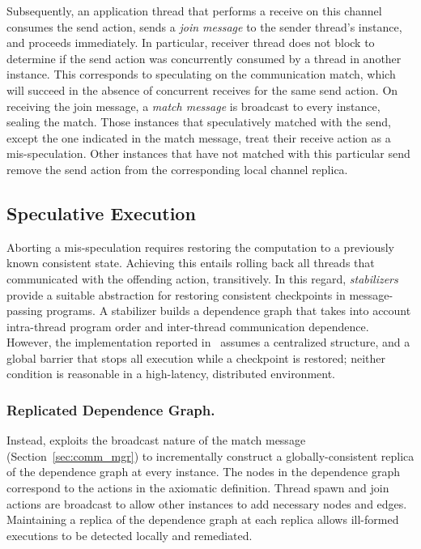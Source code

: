 Subsequently, an application thread that performs a receive on this channel
consumes the send action, sends a \emph{join message} to the sender thread's
instance, and proceeds immediately. In particular, receiver thread does not
block to determine if the send action was concurrently consumed by a thread in
another instance. This corresponds to speculating on the communication match,
which will succeed in the absence of concurrent receives for the same send
action. On receiving the join message, a \emph{match message} is broadcast to
every instance, sealing the match. Those instances that speculatively matched
with the send, except the one indicated in the match message, treat their
receive action as a mis-speculation. Other instances that have not matched with
this particular send remove the send action from the corresponding local
channel replica.

\subsection{Speculative Execution}

Aborting a mis-speculation requires restoring the computation to a previously
known consistent state. Achieving this entails rolling back all threads that
communicated with the offending action, transitively. In this regard,
\emph{stabilizers}~\cite{Ziarek10} provide a suitable abstraction for restoring
consistent checkpoints in message-passing programs.  A stabilizer builds a
dependence graph that takes into account intra-thread program order and
inter-thread communication dependence. However, the implementation reported
in~\cite{Ziarek10} assumes a centralized structure, and a global barrier that
stops all execution while a checkpoint is restored; neither condition is
reasonable in a high-latency, distributed environment.

\subsubsection{Replicated Dependence Graph.} Instead, \rxcml exploits the
broadcast nature of the match message (Section~\ref{sec:comm_mgr}) to
incrementally construct a globally-consistent replica of the dependence graph
at every instance. The nodes in the dependence graph correspond to the actions
in the axiomatic definition. Thread spawn and join actions are broadcast to
allow other instances to add necessary nodes and edges. Maintaining a replica
of the dependence graph at each replica allows ill-formed executions to be
detected locally and remediated.

